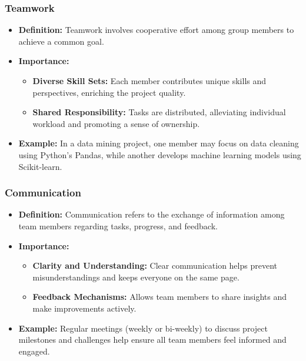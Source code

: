 \documentclass[aspectratio=169]{beamer}
\begin{document}
\begin{frame}[fragile]
    \frametitle{Teamwork}
    \begin{itemize}
        \item \textbf{Definition:} Teamwork involves cooperative effort among group members to achieve a common goal.
        
        \item \textbf{Importance:}
            \begin{itemize}
                \item \textbf{Diverse Skill Sets:} Each member contributes unique skills and perspectives, enriching the project quality.
                \item \textbf{Shared Responsibility:} Tasks are distributed, alleviating individual workload and promoting a sense of ownership.
            \end{itemize}
        
        \item \textbf{Example:} In a data mining project, one member may focus on data cleaning using Python's Pandas, while another develops machine learning models using Scikit-learn.
    \end{itemize}
\end{frame}

\begin{frame}[fragile]
    \frametitle{Communication}
    \begin{itemize}
        \item \textbf{Definition:} Communication refers to the exchange of information among team members regarding tasks, progress, and feedback.
        
        \item \textbf{Importance:}
            \begin{itemize}
                \item \textbf{Clarity and Understanding:} Clear communication helps prevent misunderstandings and keeps everyone on the same page.
                \item \textbf{Feedback Mechanisms:} Allows team members to share insights and make improvements actively.
            \end{itemize}
        
        \item \textbf{Example:} Regular meetings (weekly or bi-weekly) to discuss project milestones and challenges help ensure all team members feel informed and engaged.
    \end{itemize}
\end{frame}
\end{document}
